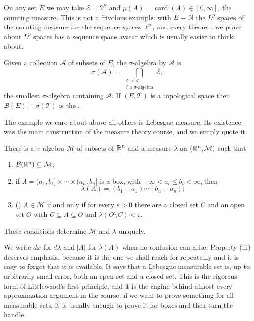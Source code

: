\documentclass[a4paper]{scrartcl}
\DeclareMathOperator{\card}{card}
\begin{document}
\begin{example}
	On any set $E$ we may take $\mathcal{E} = 2^E$ and $\mu(A) = \card(A) \in [0,\infty]$, the counting measure. This is not a frivolous example: with $E = \mathbb{N}$ the $L^p$ spaces of the counting measure are the sequence spaces $\ell^p$, and every theorem we prove about $L^p$ spaces has a sequence space avatar which is usually easier to think about.
\end{example}

\begin{definition}
	Given a collection $\mathcal{A}$ of subsets of $E$, the $\sigma$-algebra  by $\mathcal{A}$ is
	$$\sigma(\mathcal{A}) = \bigcap_{\substack{\mathcal{E} \supseteq \mathcal{A} \\ \mathcal{E} \text{ a $\sigma$-algebra}}} \mathcal{E},$$
	the smallest $\sigma$-algebra containing $\mathcal{A}$. If $(E, \mathcal{T})$ is a topological space then $\mathcal{B}(E) = \sigma(\mathcal{T})$ is the .
\end{definition}

The example we care about above all others is Lebesgue measure. Its existence was the main construction of the measure theory course, and we simply quote it.

\begin{theorem}\label{thm:lebesgue}
	There is a $\sigma$-algebra $\mathcal{M}$ of subsets of $\mathbb{R}^n$ and a measure $\lambda$ on $(\mathbb{R}^n, \mathcal{M})$ such that
	\begin{enumerate}[label=(\roman*)]
		\item $\mathcal{B}(\mathbb{R}^n) \subseteq \mathcal{M}$;
		\item if $A = (a_1, b_1] \times \cdots \times (a_n, b_n]$ is a box, with $-\infty < a_i \le b_i < \infty$, then
		$$\lambda(A) = (b_1 - a_1) \cdots (b_n - a_n);$$
		\item () $A \in \mathcal{M}$ if and only if for every $\varepsilon > 0$ there are a closed set $C$ and an open set $O$ with $C \subseteq A \subseteq O$ and $\lambda(O \setminus C) < \varepsilon$.
	\end{enumerate}
	These conditions determine $\mathcal{M}$ and $\lambda$ uniquely.
\end{theorem}

We write $dx$ for $d\lambda$ and $|A|$ for $\lambda(A)$ when no confusion can arise. Property (iii) deserves emphasis, because it is the one we shall reach for repeatedly and it is easy to forget that it is available. It says that a Lebesgue measurable set is, up to arbitrarily small error, both an open set and a closed set. This is the rigorous form of Littlewood's first principle, and it is the engine behind almost every approximation argument in the course: if we want to prove something for all measurable sets, it is usually enough to prove it for boxes and then turn the handle.
\end{document}
